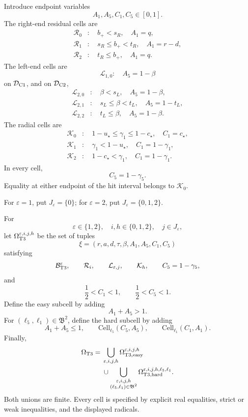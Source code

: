 Introduce endpoint variables
\[
 A_1,A_5,C_1,C_5\in[0,1].
\]
The right-end residual cells are
\[
 \begin{aligned}
 \mathcal R_0&:\quad b_+<s_R,\quad A_1=q,\\
 \mathcal R_1&:\quad s_R\le b_+<t_R,\quad A_1=r-d,\\
 \mathcal R_2&:\quad t_R\le b_+,\quad A_1=q.
 \end{aligned}
\]
The left-end cells are
\[
 \mathcal L_{1,0}:\quad A_5=1-\beta
\]
on \(\mathcal D_{\rm C1}\), and on \(\mathcal D_{\rm C2}\),
\[
 \begin{aligned}
 \mathcal L_{2,0}&:\quad \beta<s_L,\quad A_5=1-\beta,\\
 \mathcal L_{2,1}&:\quad s_L\le\beta<t_L,\quad A_5=1-t_L,\\
 \mathcal L_{2,2}&:\quad t_L\le\beta,\quad A_5=1-\beta.
 \end{aligned}
\]
The radial cells are
\[
 \begin{aligned}
 \mathcal K_0&:\quad
 1-u_\star\le\gamma_1\le1-c_\star,\quad C_1=c_\star,\\
 \mathcal K_1&:\quad
 \gamma_1<1-u_\star,\quad C_1=1-\gamma_1,\\
 \mathcal K_2&:\quad
 1-c_\star<\gamma_1,\quad C_1=1-\gamma_1.
 \end{aligned}
\]
In every cell,
\[
 C_5=1-\gamma_5.
\]
Equality at either endpoint of the hit interval belongs to \(\mathcal K_0\).

For \(\varepsilon=1\), put \(J_\varepsilon=\{0\}\); for
\(\varepsilon=2\), put \(J_\varepsilon=\{0,1,2\}\).

\begin{definition}
\label{def:s2-t3-finite-union}
For
\[
 \varepsilon\in\{1,2\},\quad
 i,h\in\{0,1,2\},\quad
 j\in J_\varepsilon,
\]
let \(\Omega_{\rm T3}^{\varepsilon,i,j,h}\) be the set of tuples
\[
 \xi=(r,a,d,\tau,\beta,A_1,A_5,C_1,C_5)
\]
satisfying
\[
 \mathcal B_{\rm T3}^{\varepsilon},
 \qquad
 \mathcal R_i,\qquad
 \mathcal L_{\varepsilon,j},\qquad
 \mathcal K_h,\qquad
 C_5=1-\gamma_5,
\]
and
\[
 \frac12<C_1<1,\qquad
 \frac12<C_5<1.
\]
Define the easy subcell by adding
\[
 A_1+A_5>1.
\]
For \((\ell_5,\ell_1)\in\mathfrak B^2\), define the hard subcell by adding
\[
 A_1+A_5\le1,\qquad
 \mathrm{Cell}_{\ell_5}(C_5,A_5),\qquad
 \mathrm{Cell}_{\ell_1}(C_1,A_1).
\]
Finally,
\[
 \begin{aligned}
 \Omega_{\rm T3}
 ={}&
 \bigcup_{\substack{\varepsilon,i,j,h}}
 \Omega_{\rm T3,easy}^{\varepsilon,i,j,h}\\
 &{}\cup
 \bigcup_{\substack{\varepsilon,i,j,h\\
                     (\ell_5,\ell_1)\in\mathfrak B^2}}
 \Omega_{\rm T3,hard}^{\varepsilon,i,j,h,\ell_5,\ell_1}.
 \end{aligned}
\]
Both unions are finite.  Every cell is specified by explicit real equalities,
strict or weak inequalities, and the displayed radicals.
\end{definition}

